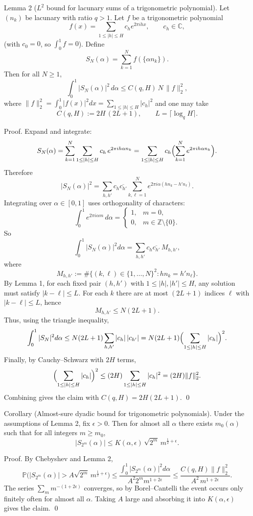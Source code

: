 Lemma 2 ($L^2$ bound for lacunary sums of a trigonometric polynomial).
Let $(n_k)$ be lacunary with ratio $q>1$.  Let $f$ be a trigonometric polynomial
\[
 f(x)=\sum_{1\le |h|\le H} c_h e^{2\pi i h x},\qquad c_h\in\mathbb{C},
\]
(with $c_0=0$, so $\int_0^1 f=0$).  Define
\[
 S_N(\alpha)=\sum_{k=1}^N f(\{\alpha n_k\}).
\]
Then for all $N\ge 1$,
\[
\int_0^1 |S_N(\alpha)|^2\,d\alpha \le C(q,H)\, N\,\|f\|_2^2,
\]
where $\|f\|_2^2=\int_0^1 |f(x)|^2dx=\sum_{1\le |h|\le H}|c_h|^2$ and one may take
\[
 C(q,H):=2H\,(2L+1),\qquad L=\lceil \log_q H\rceil.
\]

Proof.
Expand and integrate:
\[
S_N(\alpha)=\sum_{k=1}^N \sum_{1\le |h|\le H} c_h\,e^{2\pi i h\alpha n_k}
=\sum_{1\le |h|\le H} c_h \Bigl(\sum_{k=1}^N e^{2\pi i h\alpha n_k}\Bigr).
\]
Therefore
\[
|S_N(\alpha)|^2 = \sum_{h,h'} c_h\overline{c_{h'}}\sum_{k,\ell=1}^N e^{2\pi i\alpha(h n_k-h' n_\ell)}.
\]
Integrating over $\alpha\in[0,1]$ uses orthogonality of characters:
\[
\int_0^1 e^{2\pi i\alpha m}\,d\alpha = \begin{cases}1,&m=0,\\0,&m\in\mathbb{Z}\setminus\{0\}.
\end{cases}
\]
So
\[
\int_0^1 |S_N(\alpha)|^2 d\alpha
= \sum_{h,h'} c_h\overline{c_{h'}}\,M_{h,h'},
\]
where
\[
M_{h,h'} := \#\{(k,\ell)\in\{1,\dots,N\}^2 : h n_k = h' n_\ell\}.
\]
By Lemma 1, for each fixed pair $(h,h')$ with $1\le |h|,|h'|\le H$, any solution must satisfy $|k-\ell|\le L$.  For each $k$ there are at most $(2L+1)$ indices $\ell$ with $|k-\ell|\le L$, hence
\[
M_{h,h'}\le N(2L+1).
\]
Thus, using the triangle inequality,
\[
\int_0^1 |S_N|^2 d\alpha
\le N(2L+1)\sum_{h,h'} |c_h|\,|c_{h'}|
= N(2L+1)\Bigl(\sum_{1\le |h|\le H}|c_h|\Bigr)^2.
\]
Finally, by Cauchy--Schwarz with $2H$ terms,
\[
\Bigl(\sum_{1\le |h|\le H}|c_h|\Bigr)^2 \le (2H)\sum_{1\le |h|\le H}|c_h|^2 = (2H)\|f\|_2^2.
\]
Combining gives the claim with $C(q,H)=2H(2L+1)$. \qed

Corollary (Almost-sure dyadic bound for trigonometric polynomials).
Under the assumptions of Lemma 2, fix $\epsilon>0$.  Then for almost all $\alpha$ there exists $m_0(\alpha)$ such that for all integers $m\ge m_0$,
\[
|S_{2^m}(\alpha)| \le K(\alpha,\epsilon)\,\sqrt{2^m}\,m^{\frac12+\epsilon}.
\]

Proof.
By Chebyshev and Lemma 2,
\[
\mathbb{P}\bigl(|S_{2^m}(\alpha)|>A\sqrt{2^m}\,m^{\frac12+\epsilon}\bigr)
\le \frac{\int_0^1 |S_{2^m}(\alpha)|^2 d\alpha}{A^2 2^m m^{1+2\epsilon}}
\le \frac{C(q,H)\|f\|_2^2}{A^2\,m^{1+2\epsilon}}.
\]
The series $\sum_m m^{-(1+2\epsilon)}$ converges, so by Borel--Cantelli the event occurs only finitely often for almost all $\alpha$.  Taking $A$ large and absorbing it into $K(\alpha,\epsilon)$ gives the claim. \qed

